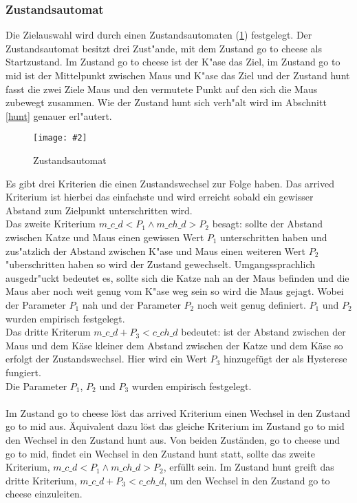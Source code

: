\documentclass[
a4paper,     %
12pt         %
]{scrartcl}  %
\newcommand{\mygraphics}[3]{
\begin{figure}[!h]
  \begin{center}
    \texttt{[image: \#2]} \\
    \caption{#3}\label{fig:#2}
  \end{center}
\end{figure}

}
\begin{document}
\subsubsection{Zustandsautomat}
Die Zielauswahl wird durch einen Zustandsautomaten (\ref{fig:stateMachine.png}) festgelegt.
Der Zustandsautomat besitzt drei Zust"ande, mit dem Zustand \glqq go to cheese\grqq{} als Startzustand. Im Zustand \glqq go to cheese\grqq{} ist der K"ase das Ziel, im Zustand \glqq go to mid\grqq{} ist der Mittelpunkt zwischen Maus und K"ase das Ziel und der Zustand \glqq hunt\grqq{} fasst die zwei Ziele Maus und den vermutete Punkt auf den sich die Maus zubewegt zusammen. Wie der Zustand \glqq hunt\grqq{} sich verh"alt wird im Abschnitt \ref{hunt} genauer erl"autert.\\
\hspace*{0.63\textwidth}
\mygraphics{0.7\textwidth}{stateMachine.png}{Zustandsautomat}
Es gibt drei Kriterien die einen Zustandswechsel zur Folge haben. Das \glqq arrived\grqq{} Kriterium ist hierbei das einfachste und wird erreicht sobald ein gewisser Abstand zum Zielpunkt unterschritten wird.\\
Das zweite Kriterium \glqq$m\_c\_d < P_{1} \land  m\_ch\_d > P_{2} $\grqq{} besagt: sollte der Abstand zwischen Katze und Maus einen gewissen Wert $P_{1}$ unterschritten haben und zus"atzlich der Abstand zwischen K"ase und Maus einen weiteren Wert $P_{2}$ "uberschritten haben so wird der Zustand gewechselt. Umgangssprachlich ausgedr"uckt bedeutet es, sollte sich die Katze nah an der Maus befinden und die Maus aber noch weit genug vom K"ase weg sein so wird die Maus gejagt. Wobei der Parameter $P_{1}$ \glqq nah \grqq{} und der Parameter $P_{2}$ \glqq noch weit genug\grqq{} definiert. 
$P_{1}$ und $P_{2}$ wurden empirisch festgelegt.\\
Das dritte Kriterum \glqq $m\_c\_d + P_{3} < c\_ch\_d$\grqq{} bedeutet: ist der Abstand zwischen der Maus und dem Käse kleiner dem Abstand zwischen der Katze und dem Käse so erfolgt der Zustandswechsel. Hier wird ein Wert $P_{3}$ hinzugefügt der als Hysterese fungiert.\\
Die Parameter $P_{1}$, $P_{2}$ und $P_{3}$ wurden empirisch festgelegt.\\
\\\clearpage
Im Zustand \glqq go to cheese\grqq{} löst das \glqq arrived\grqq{} Kriterium einen Wechsel in den Zustand \glqq go to mid\grqq{} aus. Äquivalent dazu löst das gleiche Kriterium im Zustand \glqq go to mid\grqq{} den Wechsel in den Zustand \glqq hunt\grqq{} aus.
Von beiden Zuständen, \glqq go to cheese\grqq{} und \glqq go to mid\grqq{}, findet ein Wechsel in den Zustand \glqq hunt\grqq{} statt, sollte das zweite Kriterium, \glqq$m\_c\_d < P_{1} \land  m\_ch\_d > P_{2} $\grqq{}, erfüllt sein. Im Zustand \glqq hunt\grqq{} greift das dritte Kriterium, \glqq $m\_c\_d + P_{3} < c\_ch\_d$\grqq{}, um den Wechsel in den Zustand \glqq go to cheese\grqq{} einzuleiten.
\end{document}
